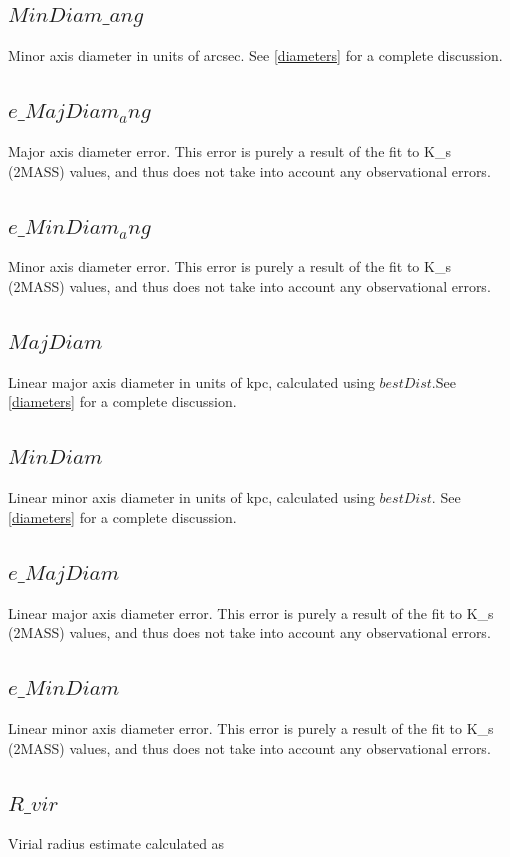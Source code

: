\documentclass[iop]{emulateapj-rtx4}
\begin{document}
\subsection{$MinDiam\_ang$}
Minor axis diameter in units of arcsec. See \ref{diameters} for a complete discussion.

\subsection{$e\_MajDiam_ang$}
Major axis diameter error. This error is purely a result of the fit to K\_s (2MASS) values, and thus does not take into account any observational errors.

\subsection{$e\_MinDiam_ang$}
Minor axis diameter error. This error is purely a result of the fit to K\_s (2MASS) values, and thus does not take into account any observational errors.

\subsection{$MajDiam$}
Linear major axis diameter in units of kpc, calculated using $bestDist$.See \ref{diameters} for a complete discussion.

\subsection{$MinDiam$}
Linear minor axis diameter in units of kpc, calculated using $bestDist$. See \ref{diameters} for a complete discussion.

\subsection{$e\_MajDiam$}
Linear major axis diameter error. This error is purely a result of the fit to K\_s (2MASS) values, and thus does not take into account any observational errors.

\subsection{$e\_MinDiam$}
Linear minor axis diameter error. This error is purely a result of the fit to K\_s (2MASS) values, and thus does not take into account any observational errors.

\subsection{$R\_vir$}
Virial radius estimate calculated as
\end{document}
